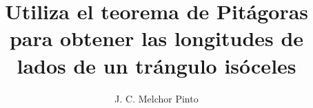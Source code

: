 \documentclass[12pt]{guia}
\title{Utiliza el teorema de Pitágoras para obtener las longitudes de lados de un trángulo isóceles}
\author{J. C. Melchor Pinto}
\begin{document}
\pagestyle{headandfoot}
\addpoints
\INFO
\printanswers

\newpage
\begin{questions}
    \questionboxed[10] 
    \questionboxed[10] 
    \questionboxed[10] 
    \questionboxed[10] 
    \questionboxed[10] 
    \questionboxed[10] 
    \questionboxed[10] 
\end{questions}
\end{document}
